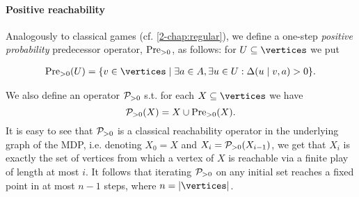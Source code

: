 

\paragraph{Positive reachability}  
Analogously to classical games (cf. \cref{2-chap:regular}), we define a one-step \emph{positive 
probability} predecessor 
operator, $\text{Pre}_{>0}$,
as follows: for $U\subseteq \vertices$ we put

\begin{align*}
\PrePos(U) &= \{v \in \vertices \mid \exists a \in \actions, \exists u \in U: 
\probTranFunc(u\mid v,a)>0 \}.\\
\end{align*}

\noindent
We also define an operator $\mathcal{P}_{>0}$ s.t. for each $X\subseteq\vertices$ we have
$$\mathcal{P}_{>0}(X) = X\cup \text{Pre}_{>0}(X).$$
It is easy to see that $\mathcal{P}_{>0}$ is a classical 
reachability operator in the underlying graph of the MDP, i.e. denoting $X_0 = 
X$ and $X_i = \mathcal{P}_{>0}(X_{i-1})$, we get that $X_i$ is exactly the set of 
vertices from which a vertex of $X$ is reachable via a finite play of length at 
most $i$. It follows that iterating $\mathcal{P}_{>0}$ on any initial set reaches a 
fixed point in at most $n-1$ steps, where $n=|\vertices|$.

